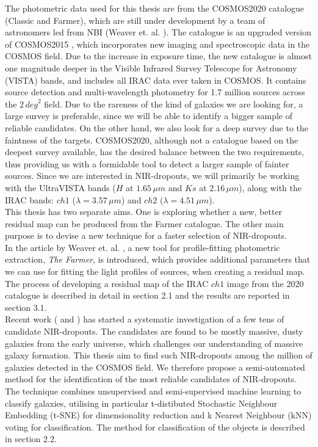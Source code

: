 The photometric data used for this thesis are from the COSMOS2020 catalogue (Classic and Farmer), which are still under development by a team of astronomers led from NBI (Weaver et. al. \cite{Weaver_2020}). The catalogue is an upgraded version of COSMOS2015 \cite{Laigle_2016}, which incorporates new imaging and spectroscopic data in the COSMOS field. Due to the increase in exposure time, the new catalogue is almost one magnitude deeper in the Visible Infrared
Survey Telescope for Astronomy (VISTA) bands, and includes all IRAC data ever taken in COSMOS. It contains source detection and multi-wavelength photometry for 1.7 million sources across the 2\,$\si{deg}^2$ field. Due to the rareness of the kind of galaxies we are looking for, a large survey is preferable, since we will be able to identify a bigger sample of reliable candidates. On the other hand, we also look for a deep survey due to the faintness of the targets. COSMOS2020, although not a catalogue based on the deepest survey available, has the desired balance between the two requirements, thus providing us with a formidable tool to detect a larger sample of fainter sources. Since we are interested in NIR-dropouts, we will primarily be working with the UltraVISTA bands ($H$ at $1.65\,\si{\mu m}$ and $Ks$ at $2.16\,\si{\mu m}$), along with the IRAC bands: $ch1$ ($\lambda = 3.57\,\si{\mu m}$) and $ch2$ ($\lambda = 4.51\,\si{\mu m}$). \\

This thesis has two separate aims. One is exploring whether a new, better residual map can be produced from the Farmer catalogue. The other main purpose is to devise a new technique for a faster selection of NIR-dropouts. \\
In the article by Weaver et. al. \cite{Weaver_2020}, a new tool for profile-fitting photometric extraction, \textit{The Farmer}, is introduced, which provides additional parameters that we can use for fitting the light profiles of sources, when creating a residual map. The process of developing a residual map of the IRAC $ch1$ image from the 2020 catalogue is described in detail in section 2.1 and the results are reported in section 3.1.\\
Recent work (\cite{Alcalde_Pampliega_2019} and \cite{Wang_2019}) has started a systematic investigation of a few tens of candidate NIR-dropouts. The candidates are found to be mostly massive, dusty galaxies from the early universe, which challenges our understanding of massive galaxy formation. This thesis aim to find such NIR-dropouts among the million of galaxies detected in the COSMOS field. We therefore propose a semi-automated method for the identification of the most reliable candidates of NIR-dropouts. The technique combines unsupervised and semi-supervised machine learning to classify galaxies, utilising in particular t-distibuted Stochastic Neighbour Embedding (t-SNE) for dimensionality reduction and k Nearest Neighbour (kNN) voting for classification. The method for classification of the objects is described in section 2.2.


